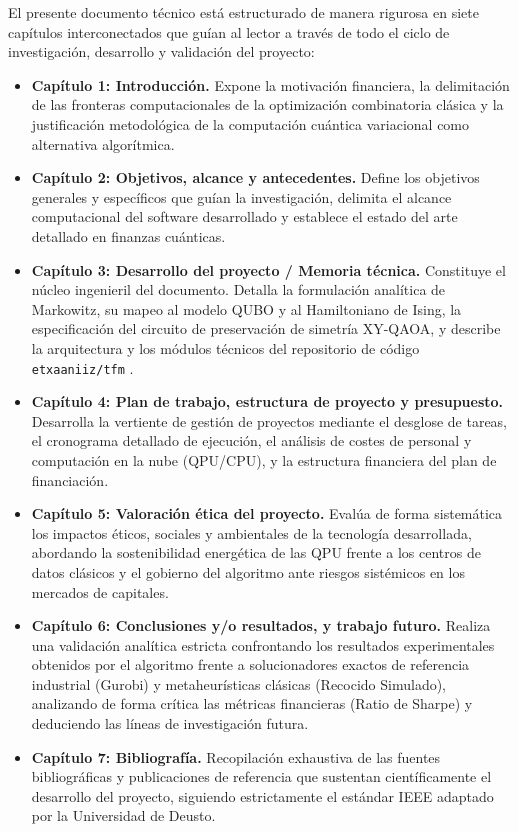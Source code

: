 El presente documento técnico está estructurado de manera rigurosa en siete capítulos interconectados que guían al lector a través de todo el ciclo de investigación, desarrollo y validación del proyecto:

\begin{itemize}
    \item \textbf{Capítulo 1: Introducción.} Expone la motivación financiera, la delimitación de las fronteras computacionales de la optimización combinatoria clásica y la justificación metodológica de la computación cuántica variacional como alternativa algorítmica.
    \item \textbf{Capítulo 2: Objetivos, alcance y antecedentes.} Define los objetivos generales y específicos que guían la investigación, delimita el alcance computacional del software desarrollado y establece el estado del arte detallado en finanzas cuánticas.
    \item \textbf{Capítulo 3: Desarrollo del proyecto / Memoria técnica.} Constituye el núcleo ingenieril del documento. Detalla la formulación analítica de Markowitz, su mapeo al modelo QUBO y al Hamiltoniano de Ising, la especificación del circuito de preservación de simetría XY-QAOA, y describe la arquitectura y los módulos técnicos del repositorio de código \texttt{etxaaniiz/tfm} \cite{Etxaaniiz2026}.
    \item \textbf{Capítulo 4: Plan de trabajo, estructura de proyecto y presupuesto.} Desarrolla la vertiente de gestión de proyectos mediante el desglose de tareas, el cronograma detallado de ejecución, el análisis de costes de personal y computación en la nube (QPU/CPU), y la estructura financiera del plan de financiación.
    \item \textbf{Capítulo 5: Valoración ética del proyecto.} Evalúa de forma sistemática los impactos éticos, sociales y ambientales de la tecnología desarrollada, abordando la sostenibilidad energética de las QPU frente a los centros de datos clásicos y el gobierno del algoritmo ante riesgos sistémicos en los mercados de capitales.
    \item \textbf{Capítulo 6: Conclusiones y/o resultados, y trabajo futuro.} Realiza una validación analítica estricta confrontando los resultados experimentales obtenidos por el algoritmo frente a solucionadores exactos de referencia industrial (Gurobi) y metaheurísticas clásicas (Recocido Simulado), analizando de forma crítica las métricas financieras (Ratio de Sharpe) y deduciendo las líneas de investigación futura.
    \item \textbf{Capítulo 7: Bibliografía.} Recopilación exhaustiva de las fuentes bibliográficas y publicaciones de referencia que sustentan científicamente el desarrollo del proyecto, siguiendo estrictamente el estándar IEEE adaptado por la Universidad de Deusto.
\end{itemize}